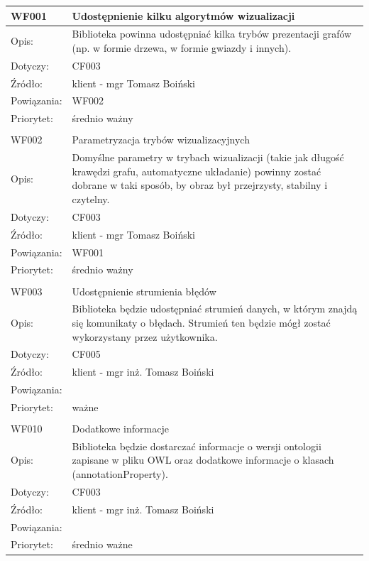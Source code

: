 \begin{center}

\begin{tabular}{|m{3cm}|m{9cm}|} \hline

WF001 & Udostępnienie kilku algorytmów wizualizacji \\ \hline
Opis: & Biblioteka powinna udostępniać kilka trybów prezentacji grafów (np. w formie drzewa, w formie gwiazdy i innych).    \\ \hline
Dotyczy: & CF003 \\ \hline
Źródło: & klient - mgr Tomasz Boiński \\ \hline
Powiązania: &WF002 \\ \hline
Priorytet: & średnio ważny\\ \hline

\multicolumn{2}{c}{} \\
 \hline

WF002 & Parametryzacja trybów wizualizacyjnych \\ \hline
Opis: & Domyślne parametry w trybach wizualizacji (takie jak długość krawędzi grafu, automatyczne układanie) powinny zostać dobrane w taki sposób, by obraz był przejrzysty, stabilny i czytelny.    \\ \hline
Dotyczy: & CF003 \\ \hline
Źródło: &  klient - mgr Tomasz Boiński\\ \hline
Powiązania: & WF001 \\ \hline
Priorytet: & średnio ważny \\ \hline

\multicolumn{2}{c}{} \\
 \hline

WF003 & Udostępnienie strumienia błędów \\ \hline
Opis: &   Biblioteka będzie udostępniać strumień danych, w którym znajdą się komunikaty o błędach. Strumień ten będzie mógł zostać wykorzystany przez użytkownika. \\ \hline
Dotyczy: &  CF005  \\ \hline
Źródło: & klient - mgr inż. Tomasz Boiński \\ \hline
Powiązania: & \\ \hline
Priorytet: & ważne \\ \hline

\multicolumn{2}{c}{} \\
 \hline

WF010 & Dodatkowe informacje \\ \hline
Opis: &   Biblioteka będzie dostarczać informacje o wersji ontologii zapisane w pliku OWL oraz dodatkowe informacje o klasach (annotationProperty). \\ \hline
Dotyczy: &  CF003  \\ \hline
Źródło: & klient - mgr inż. Tomasz Boiński \\ \hline
Powiązania: & \\ \hline
Priorytet: & średnio ważne \\ \hline

\end{tabular}

\end{center}

